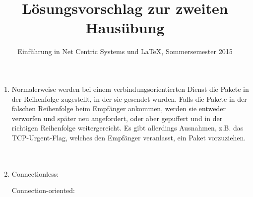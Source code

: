 \documentclass[a4paper,
			llpt,
			solution,
			accentcolor=tud2d,
			colorbacktitle
			]
			{tudexercise}
\title{Lösungsvorschlag zur zweiten Hausübung}
\subtitle{Einführung in Net Centric Systems und \LaTeX, Sommersemester 2015}
\begin{document}
\maketitle
\section{}


\begin{multicols}{2}
\begin{enumerate}

\item
Normalerweise werden bei einem verbindungsorientierten Dienst die Pakete in der Reihenfolge zugestellt, in der sie gesendet wurden. Falls die Pakete in der falschen Reihenfolge beim Empfänger ankommen, werden sie entweder verworfen und später neu angefordert, oder aber gepuffert und in der richtigen Reihenfolge weitergereicht.
Es gibt allerdings Ausnahmen, z.B. das TCP-Urgent-Flag, welches den Empfänger veranlasst, ein Paket vorzuziehen.
\\\\\\
\item
Connectionless:
Connection-oriented:
\end{enumerate}
\end{multicols}



\section{}
\end{document}
